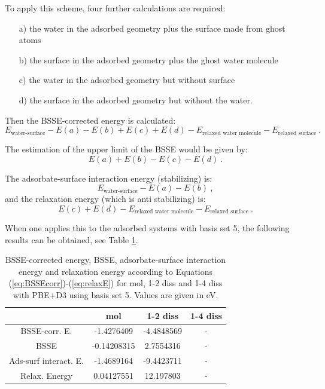 \documentclass[11pt,DIV=13,BCOR=5mm,a4paper,headinclude]{scrbook}
\begin{document}
To apply this scheme, four further calculations are required:
\begin{itemize}
 \item[a)] the water in the adsorbed geometry plus the surface made from ghost atoms
 \item[b)] the surface in the adsorbed geometry plus the ghost water molecule
 \item[c)] the water in the adsorbed geometry but without surface
 \item[d)] the surface in the adsorbed geometry but without the water.
\end{itemize}

Then the BSSE-corrected energy is calculated:
\begin{equation}\label{eq:BSSEcorr}
 E_{\textrm{water-surface}}-E(a)-E(b)+E(c)+E(d)-E_{\textrm{relaxed water molecule}}-E_{\textrm{relaxed surface}} ~.
\end{equation}

The estimation of the upper limit of the BSSE would be given by:
\begin{equation}
 E(a)+E(b)-E(c)-E(d) ~.
\end{equation}

The adsorbate-surface interaction energy (stabilizing) is:
\begin{equation}
 E_{\textrm{water-surface}}-E(a)-E(b) ~,
\end{equation}
and the relaxation energy (which is anti stabilizing) is:
\begin{equation}\label{eq:relaxE}
 E(c)+E(d)-E_{\textrm{relaxed water molecule}}-E_{\textrm{relaxed surface}} ~.
\end{equation}


When one applies this to the adsorbed systems with basis set 5, the following results can be obtained, see Table \ref{tab:bsse-results}.
\begin{table}[!h]
  \centering
   \caption{BSSE-corrected energy, BSSE, adsorbate-surface interaction energy and relaxation energy according to Equations (\ref{eq:BSSEcorr})-(\ref{eq:relaxE}) for mol, 1-2 diss and 1-4 diss with PBE+D3 using basis set 5.
Values are given in eV.}
  \begin{tabular}{c|ccc}
  \toprule
			& mol  & 1-2 diss & 1-4 diss \\\midrule
  BSSE-corr. E.		&-1.4276409 &-4.4848569 & -\\
  BSSE			&-0.14208315&2.7554316 & -\\
  Ads-surf interact. E.	&-1.4689164 &-9.4423711 & -\\
  Relax. Energy		&0.04127551 &12.197803 & -\\\bottomrule
  \end{tabular}
  \label{tab:bsse-results}
 \end{table}
 \\
 
\end{document}
